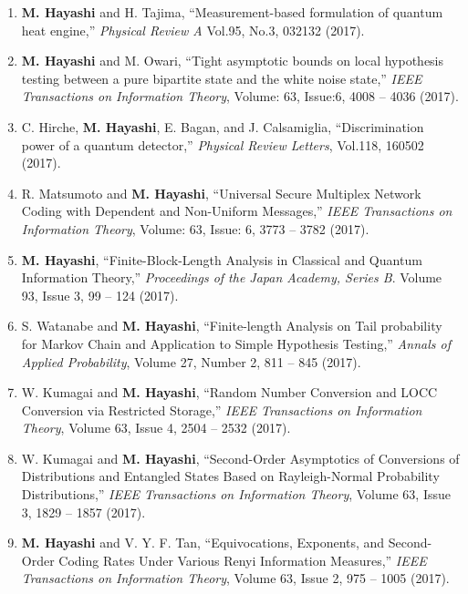 \documentclass[a4paper,12pt,oneside]{article}
\begin{document}
\begin{enumerate}
\item
\textbf{M. Hayashi} and H. Tajima, 
``Measurement-based formulation of quantum heat engine,'' 
{\em Physical Review A} Vol.95, No.3, 032132 (2017). 

\item
\textbf{M. Hayashi} and M. Owari, 
``Tight asymptotic bounds on local hypothesis testing between a pure bipartite state and the white noise state,'' 
{\em IEEE Transactions on Information Theory}, 
Volume: 63, Issue:6, 4008 -- 4036 (2017). 

\item
C. Hirche, \textbf{M. Hayashi}, E. Bagan, and J. Calsamiglia, 
``Discrimination power of a quantum detector,'' 
{\em Physical Review Letters}, Vol.118, 160502 (2017). 

\item
R. Matsumoto and \textbf{M. Hayashi},  
``Universal Secure Multiplex Network Coding with Dependent and Non-Uniform Messages,'' 
{\em IEEE Transactions on Information Theory}, Volume: 63, Issue: 6, 3773 -- 3782 (2017). 

\item 
\textbf{M. Hayashi}, ``Finite-Block-Length Analysis in Classical and Quantum Information Theory,'' 
{\em Proceedings of the Japan Academy, Series B}.
Volume 93, Issue 3, 99 -- 124 (2017).

\item 
S. Watanabe and \textbf{M. Hayashi}, ``Finite-length Analysis on Tail probability for Markov Chain and Application to Simple Hypothesis Testing,'' 
{\em Annals of Applied Probability},
Volume 27, Number 2, 811 -- 845 (2017).

\item 
W. Kumagai and \textbf{M. Hayashi}, ``Random Number Conversion and LOCC Conversion via Restricted Storage,'' 
{\em IEEE Transactions on Information Theory},
Volume 63, Issue 4, 2504 -- 2532 (2017). 

\item 
W. Kumagai and \textbf{M. Hayashi}, ``Second-Order Asymptotics of Conversions of Distributions and Entangled States Based on Rayleigh-Normal Probability Distributions,'' 
{\em IEEE Transactions on Information Theory}, Volume 63, Issue 3, 1829 -- 1857 (2017). 

\item 
\textbf{M. Hayashi} and V. Y. F. Tan, ``Equivocations, Exponents, and Second-Order Coding Rates Under Various Renyi Information Measures,'' 
{\em IEEE Transactions on Information Theory}, Volume 63, Issue 2, 975 -- 1005 (2017). 


\end{enumerate}
\end{document}

